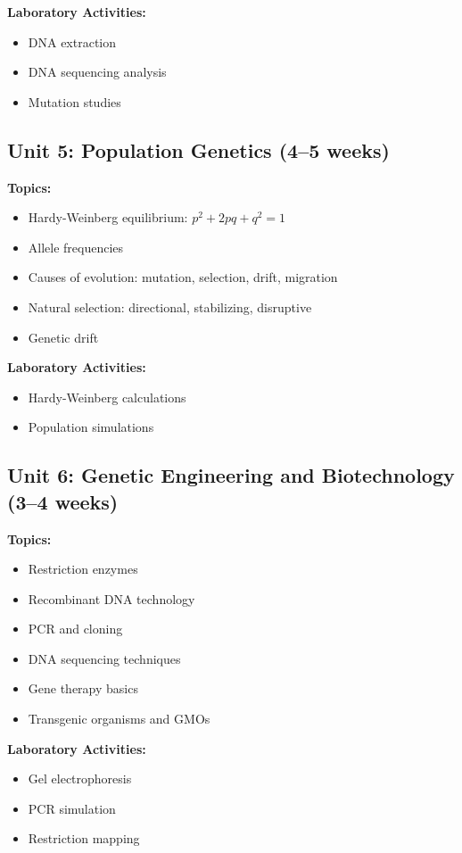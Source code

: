 \documentclass[12pt,oneside]{book}
\begin{document}
\textbf{Laboratory Activities:}
\begin{itemize}
    \item DNA extraction
    \item DNA sequencing analysis
    \item Mutation studies
\end{itemize}

\subsection{Unit 5: Population Genetics (4--5 weeks)}

\textbf{Topics:}
\begin{itemize}
    \item Hardy-Weinberg equilibrium: $p^2 + 2pq + q^2 = 1$
    \item Allele frequencies
    \item Causes of evolution: mutation, selection, drift, migration
    \item Natural selection: directional, stabilizing, disruptive
    \item Genetic drift
\end{itemize}

\textbf{Laboratory Activities:}
\begin{itemize}
    \item Hardy-Weinberg calculations
    \item Population simulations
\end{itemize}

\subsection{Unit 6: Genetic Engineering and Biotechnology (3--4 weeks)}

\textbf{Topics:}
\begin{itemize}
    \item Restriction enzymes
    \item Recombinant DNA technology
    \item PCR and cloning
    \item DNA sequencing techniques
    \item Gene therapy basics
    \item Transgenic organisms and GMOs
\end{itemize}

\textbf{Laboratory Activities:}
\begin{itemize}
    \item Gel electrophoresis
    \item PCR simulation
    \item Restriction mapping
\end{itemize}
\end{document}
